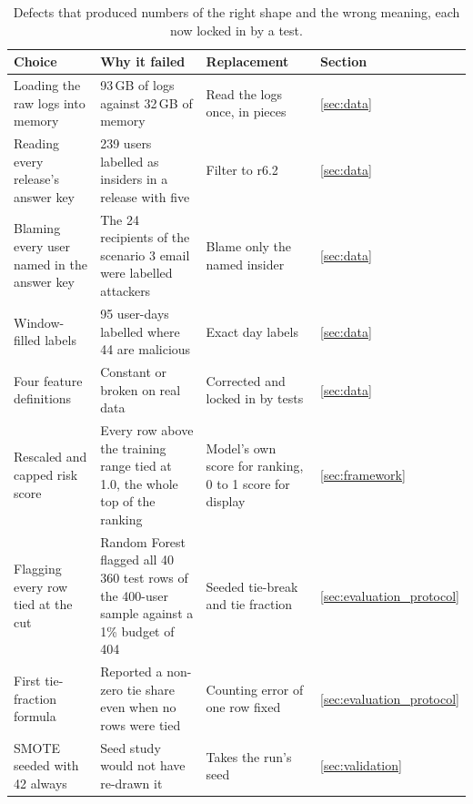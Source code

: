 \documentclass[a4paper,12pt]{article}
\begin{document}
\begin{table}[htbp]
\centering
\caption{Defects that produced numbers of the right shape and the wrong meaning, each now locked in by a test.}
\label{tab:defects}
\footnotesize
\setlength{\tabcolsep}{3pt}
\begin{tabular}{@{}R{2.8cm} R{5.0cm} R{3.7cm} l@{}}
\toprule
\textbf{Choice} & \textbf{Why it failed} & \textbf{Replacement} & \textbf{Section} \\
\midrule
Loading the raw logs into memory & 93\,GB of logs against 32\,GB of memory & Read the logs once, in pieces & \ref{sec:data} \\
Reading every release's answer key & 239 users labelled as insiders in a release with five & Filter to r6.2 & \ref{sec:data} \\
Blaming every user named in the answer key & The 24 recipients of the scenario 3 email were labelled attackers & Blame only the named insider & \ref{sec:data} \\
Window-filled labels & 95 user-days labelled where 44 are malicious & Exact day labels & \ref{sec:data} \\
Four feature definitions & Constant or broken on real data & Corrected and locked in by tests & \ref{sec:data} \\
Rescaled and capped risk score & Every row above the training range tied at 1.0, the whole top of the ranking & Model's own score for ranking, 0 to 1 score for display & \ref{sec:framework} \\
Flagging every row tied at the cut & Random Forest flagged all 40\,360 test rows of the 400-user sample against a 1\% budget of 404 & Seeded tie-break and tie fraction & \ref{sec:evaluation_protocol} \\
First tie-fraction formula & Reported a non-zero tie share even when no rows were tied & Counting error of one row fixed & \ref{sec:evaluation_protocol} \\
SMOTE seeded with 42 always & Seed study would not have re-drawn it & Takes the run's seed & \ref{sec:validation} \\
\bottomrule
\end{tabular}
\end{table}
\end{document}
